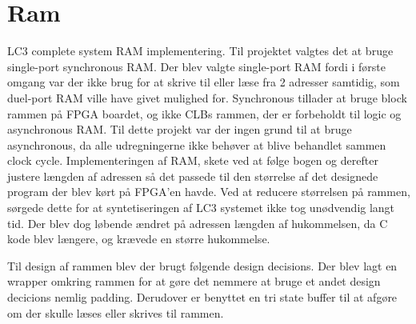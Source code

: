 \section{Ram}
 LC3 complete system RAM implementering.
Til projektet valgtes det at bruge single-port synchronous RAM. Der blev valgte single-port RAM fordi i første omgang var der ikke brug for at skrive til eller læse fra 2 adresser samtidig, som duel-port RAM ville have givet mulighed for. Synchronous tillader at bruge block rammen på FPGA boardet, og ikke CLBs rammen, der er forbeholdt til logic og asynchronous RAM. Til dette projekt var der ingen grund til at bruge asynchronous, da alle udregningerne ikke behøver at blive behandlet sammen clock cycle. Implementeringen af RAM, skete ved at følge bogen %
og derefter justere længden af adressen så det passede til den størrelse af det designede program der blev kørt på FPGA'en havde. Ved at reducere størrelsen på rammen, sørgede dette for at syntetiseringen af LC3 systemet ikke tog unødvendig langt tid. Der blev dog løbende ændret på adressen længden af hukommelsen, da C kode blev længere, og krævede en større hukommelse. %

Til design af rammen blev der brugt følgende design decisions. Der blev lagt en wrapper omkring rammen for at gøre det nemmere at bruge et andet design decicions nemlig padding. Derudover er benyttet en tri state buffer til at afgøre om der skulle læses eller skrives til rammen.
